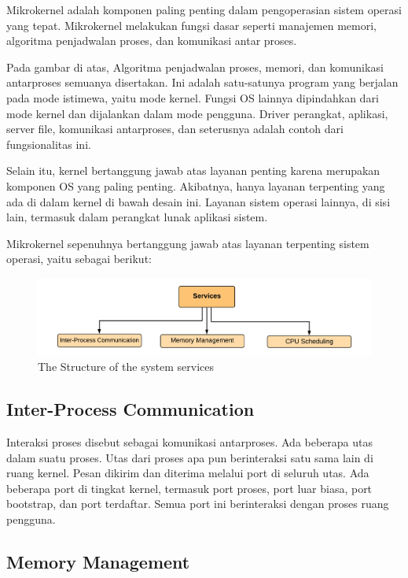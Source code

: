\documentclass{report}
\begin{document}
	Mikrokernel adalah komponen paling penting dalam pengoperasian sistem operasi yang tepat. Mikrokernel melakukan fungsi dasar seperti manajemen memori, algoritma penjadwalan proses, dan komunikasi antar proses.
	
	Pada gambar di atas, Algoritma penjadwalan proses, memori, dan komunikasi antarproses semuanya disertakan. Ini adalah satu-satunya program yang berjalan pada mode istimewa, yaitu mode kernel. Fungsi OS lainnya dipindahkan dari mode kernel dan dijalankan dalam mode pengguna. Driver perangkat, aplikasi, server file, komunikasi antarproses, dan seterusnya adalah contoh dari fungsionalitas ini.
	
	Selain itu, kernel bertanggung jawab atas layanan penting karena merupakan komponen OS yang paling penting. Akibatnya, hanya layanan terpenting yang ada di dalam kernel di bawah desain ini. Layanan sistem operasi lainnya, di sisi lain, termasuk dalam perangkat lunak aplikasi sistem.
	
	Mikrokernel sepenuhnya bertanggung jawab atas layanan terpenting sistem operasi, yaitu sebagai berikut:
	
	\begin{figure}
		\centering
		\includegraphics[width=12cm]{Mikrokernel-2.png}
		\caption{The Structure of the system services}
	\end{figure}
	
	\subsection*{Inter-Process Communication}
	
	Interaksi proses disebut sebagai komunikasi antarproses. Ada beberapa utas dalam suatu proses. Utas dari proses apa pun berinteraksi satu sama lain di ruang kernel. Pesan dikirim dan diterima melalui port di seluruh utas. Ada beberapa port di tingkat kernel, termasuk port proses, port luar biasa, port bootstrap, dan port terdaftar. Semua port ini berinteraksi dengan proses ruang pengguna.
	
	\subsection*{Memory Management}
	
\end{document}
